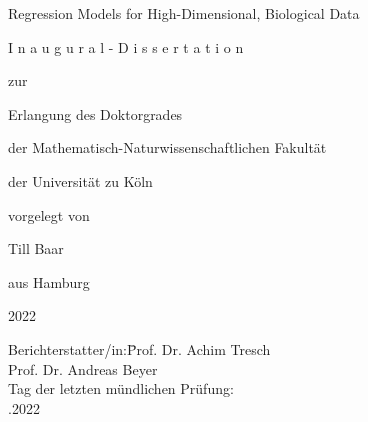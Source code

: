 
\begin{center}\large{

Regression Models for High-Dimensional, Biological Data

\vspace{3\baselineskip}
\begin{otherlanguage}{german}

I n a u g u r a l - D i s s e r t a t i o n

\vspace{1.5\baselineskip}

zur

\vspace{1.5\baselineskip}

Erlangung des Doktorgrades

\vspace{1.5\baselineskip}

der Mathematisch-Naturwissenschaftlichen Fakultät

\vspace{1.5\baselineskip}

der Universität zu Köln

\vspace{1.5\baselineskip}

vorgelegt von

\vspace{1.5\baselineskip}

Till Baar

\vspace{1.5\baselineskip}

aus Hamburg

\vspace{1.5\baselineskip}

2022

\end{otherlanguage}
}\end{center}

\clearpage

\large{
\begin{tabbing}
Berichterstatter/in:\qquad \= Prof. Dr. Achim Tresch  \\[1.50\baselineskip]
                           \> Prof. Dr. Andreas Beyer \\[2.25\baselineskip]
Tag der letzten mündlichen Prüfung:                   \\[0.75\baselineskip]
                           .2022
\end{tabbing}
}

\restoregeometry
